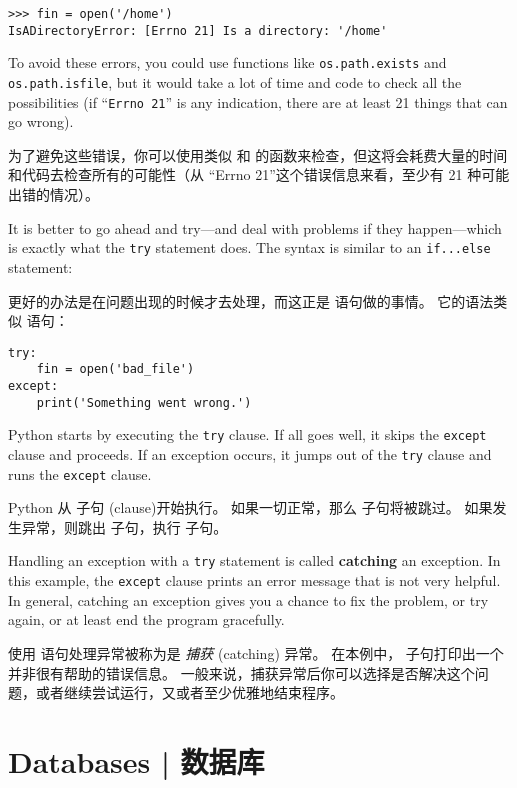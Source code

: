 {{{{{{{\begin{lstlisting}
>>> fin = open('/home')
IsADirectoryError: [Errno 21] Is a directory: '/home'
\end{lstlisting}

%
To avoid these errors, you could use functions like {\tt os.path.exists}
and {\tt os.path.isfile}, but it would take a lot of time and code
to check all the possibilities (if ``{\tt Errno 21}'' is any
indication, there are at least 21 things that can go wrong).

为了避免这些错误，你可以使用类似  和  的函数来检查，但这将会耗费大量的时间和代码去检查所有的可能性（从 ``Errno 21''这个错误信息来看，至少有 21 种可能出错的情况）。

  

It is better to go ahead and try---and deal with problems if they
happen---which is exactly what the {\tt try} statement does.  The
syntax is similar to an {\tt if...else} statement:

更好的办法是在问题出现的时候才去处理，而这正是  语句做的事情。
它的语法类似  语句：

\begin{lstlisting}
try:
    fin = open('bad_file')
except:
    print('Something went wrong.')
\end{lstlisting}

%
Python starts by executing the {\tt try} clause.  If all goes
well, it skips the {\tt except} clause and proceeds.  If an
exception occurs, it jumps out of the {\tt try} clause and
runs the {\tt except} clause.

Python 从  子句 (clause)开始执行。
如果一切正常，那么  子句将被跳过。
如果发生异常，则跳出  子句，执行  子句。

Handling an exception with a {\tt try} statement is called {\bf
catching} an exception.  In this example, the {\tt except} clause
prints an error message that is not very helpful.  In general,
catching an exception gives you a chance to fix the problem, or try
again, or at least end the program gracefully.

使用  语句处理异常被称为是 {\em 捕获} (catching) 异常。
在本例中， 子句打印出一个并非很有帮助的错误信息。
一般来说，捕获异常后你可以选择是否解决这个问题，或者继续尝试运行，又或者至少优雅地结束程序。


\section{Databases  |  数据库}

}}}}}}}
